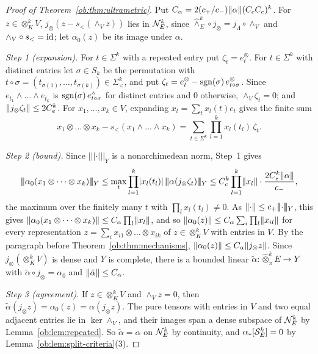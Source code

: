 \begin{proof}[Proof of Theorem~\ref{ob:thm:ultrametric}]
Put $C_\alpha=2(c_+/c_-)\lVert \alpha\rVert(C_cC_e)^k$. For
$z\in\otimes^k_KV$, $j_\otimes(z-s_<(\wedge_Vz))$ lies in $\mathcal N^k_E$, since $\widehat\wedge^k_E\circ j_\otimes=j_\Lambda\circ\wedge_V$
and $\wedge_V\circ s_<=\mathrm{id}$; let $\alpha_0(z)$ be its image under $\alpha$.

\emph{Step 1 (expansion).} For $t\in\Sigma^k$ with a repeated entry put $\zeta_t=e^\otimes_t$. For $t\in\Sigma^k$ with
distinct entries let $\sigma\in S_k$ be the permutation with $t\circ\sigma=(t_{\sigma(1)},\dots,t_{\sigma(k)})\in\Sigma^k_<$,
and put $\zeta_t=e^\otimes_t-\operatorname{sgn}(\sigma)\,e^\otimes_{t\circ\sigma}$. Since $e_{t_1}\wedge\dots\wedge e_{t_k}$ is
$\operatorname{sgn}(\sigma)\,e^\wedge_{t\circ\sigma}$ for distinct entries and $0$ otherwise, $\wedge_V\zeta_t=0$; and
$\lVert j_\otimes\zeta_t\rVert\le2C_e^k$. For $x_1,\dots,x_k\in V$, expanding $x_l=\sum_tx_l(t)e_t$ gives the finite sum
\[
 x_1\otimes\dots\otimes x_k-s_<(x_1\wedge\dots\wedge x_k)=\sum_{t\in\Sigma^k}\prod_{l=1}^kx_l(t_l)\,\zeta_t.
\]

\emph{Step 2 (bound).} Since $\lvert\!\lvert\!\lvert\cdot\rvert\!\rvert\!\rvert_Y$ is a nonarchimedean norm, Step~1 gives
\[
 \lvert\!\lvert\!\lvert\alpha_0(x_1\otimes\dots\otimes x_k)\rvert\!\rvert\!\rvert_Y\le\max_t\prod_{l=1}^k\abs{x_l(t_l)}\,\lvert\!\lvert\!\lvert\alpha(j_\otimes\zeta_t)\rvert\!\rvert\!\rvert_Y
 \le C_c^k\prod_{l=1}^k\norm{x_l}\cdot\frac{2C_e^k\norm\alpha}{c_-},
\]
the maximum over the finitely many $t$ with $\prod_lx_l(t_l)\ne0$. As $\lVert \cdot\rVert\le c_+\lvert\!\lvert\!\lvert\cdot\rvert\!\rvert\!\rvert_Y$, this gives
$\lVert \alpha_0(x_1\otimes\dots\otimes x_k)\rVert\le C_\alpha\prod_l\lVert x_l\rVert$, and so
$\lVert \alpha_0(z)\rVert\le C_\alpha\sum_i\prod_l\lVert x_{il}\rVert$ for every representation $z=\sum_ix_{i1}\otimes\dots\otimes x_{ik}$ of
$z\in\otimes^k_KV$ with entries in $V$. By the paragraph before Theorem~\ref{ob:thm:mechanisms},
$\lVert \alpha_0(z)\rVert\le C_\alpha\lVert j_\otimes z\rVert$. Since $j_\otimes(\otimes^k_KV)$ is dense and $Y$ is complete, there is a
bounded linear $\tilde\alpha\colon\widehat\otimes^k_\pi E\to Y$ with $\tilde\alpha\circ j_\otimes=\alpha_0$ and
$\lVert \tilde\alpha\rVert\le C_\alpha$.

\emph{Step 3 (agreement).} If $z\in\otimes^k_KV$ and $\wedge_Vz=0$, then $\tilde\alpha(j_\otimes z)=\alpha_0(z)=\alpha(j_\otimes z)$.
The pure tensors with entries in $V$ and two equal adjacent entries lie in $\ker\wedge_V$, and their images span a dense
subspace of $\mathcal N^k_E$ by Lemma~\ref{ob:lem:repeated}. So $\tilde\alpha=\alpha$ on $\mathcal N^k_E$ by continuity, and
$\alpha_*[\mathcal S^k_E]=0$ by Lemma~\ref{ob:lem:split-criteria}(3).


\end{proof}
